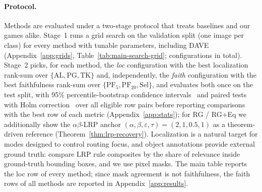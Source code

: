 \documentclass[twoside]{article}
\newcommand{\1}{\mathbf{1}}
\begin{document}
\paragraph{Protocol.}
Methods are evaluated under a two-stage protocol that treats baselines and our games alike. Stage~1
runs a grid search on the validation split (one image per class) for every method with tunable
parameters, including DAVE (Appendix~\ref{app:grids}, Table~\ref{tab:main-search-grid}; \nValGrid{}
configurations in total). Stage~2 picks, for each method, the \emph{loc} configuration with the
best localization rank-sum over $\{\text{AL}, \text{PG}, \text{TK}\}$ and, independently, the
\emph{faith} configuration with the best faithfulness rank-sum over $\{\text{PF}_5, \text{PF}_{20},
    \text{Sel}\}$, and evaluates both once on the test split, with 95\% percentile-bootstrap confidence
intervals~\citep{Efron1993bootstrap} and paired tests with Holm correction~\citep{Holm1979} over all
eligible row pairs before reporting comparisons with the best row of each metric
(Appendix~\ref{app:stats}); for \ac{RG} / \ac{RG}+Eq we additionally show
the $\alpha\beta$-\ac{LRP} anchor $(\alpha,\beta,\varepsilon,\tau){=}(2,1,0.5,1)$ as a
theorem-driven reference (Theorem~\ref{thm:lrp-recovery}). Localization is a natural target for
modes designed to control routing focus, and object annotations provide external ground truth:
\citet{Kohlbrenner2020} compare \ac{LRP} rule composites by the share of relevance inside
ground-truth bounding boxes, and we use pixel masks. The main table reports the loc row of every
method; since mask agreement is not faithfulness, the faith rows of all methods are reported in
Appendix~\ref{app:results}.
\end{document}
